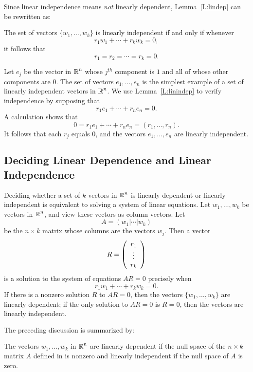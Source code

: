 \documentclass{ximera}
\begin{document}
Since linear independence means {\em not\/} linearly dependent,
Lemma~\ref{L:lindep} can be rewritten as:
\begin{lemma}  \label{L:linindep}
The set of vectors $\{w_1,\ldots,w_k\}$ is linearly independent if and
only if whenever
\[
r_1w_1 + \cdots + r_kw_k = 0,
\]
it follows that
\[
r_1 = r_2 = \cdots = r_k = 0.
\]
\end{lemma}

Let $e_j$ be the vector in $\mbox{$\Bbb{R}$}^n$ whose $j^{th}$ component is $1$
and all of whose other components are $0$. The set of vectors
$e_1,\ldots,e_n$ is the simplest example of a set of linearly
independent vectors in $\mbox{$\Bbb{R}$}^n$.  We use Lemma~\ref{L:linindep} to
verify independence by supposing that
\[
r_1e_1 + \cdots + r_ne_n = 0.
\]
A calculation shows that
\[
0 = r_1e_1 + \cdots + r_ne_n = (r_1,\ldots,r_n).
\]
It follows that each $r_j$ equals $0$, and the vectors
$e_1,\ldots,e_n$ are linearly independent.


\subsection*{Deciding Linear Dependence and Linear Independence}

Deciding whether a set of $k$ vectors in $\mbox{$\Bbb{R}$}^n$ is linearly
dependent or linearly independent is equivalent to solving a
system of linear equations.  Let $w_1,\ldots,w_k$ be vectors
in $\mbox{$\Bbb{R}$}^n$, and view these vectors as column vectors. Let
\begin{equation}  \label{E:Ank}
A=(w_1|\cdots|w_k)
\end{equation}
be the $n\times k$ matrix whose columns are the vectors $w_j$.
Then a vector
\[
R = \left(\begin{array}{c} r_1 \\ \vdots \\ r_{k}\end{array}\right)
\]
is a solution to the system of equations $AR=0$ precisely when
\begin{equation}
r_1w_1 + \cdots + r_kw_k = 0.
\end{equation}
If there is a nonzero solution $R$ to $AR=0$, then the vectors
$\{w_1,\ldots,w_k\}$ are linearly dependent; if the only solution
to $AR=0$ is $R=0$, then the vectors are linearly independent.

The preceding discussion is summarized by:
\begin{lemma}
The vectors $w_1,\ldots,w_k$ in $\mbox{$\Bbb{R}$}^n$ are linearly dependent if the
null space of the $n\times k$ matrix $A$ defined in  is
nonzero and linearly independent if the null space of $A$ is zero.
\end{lemma} 
\end{document}
